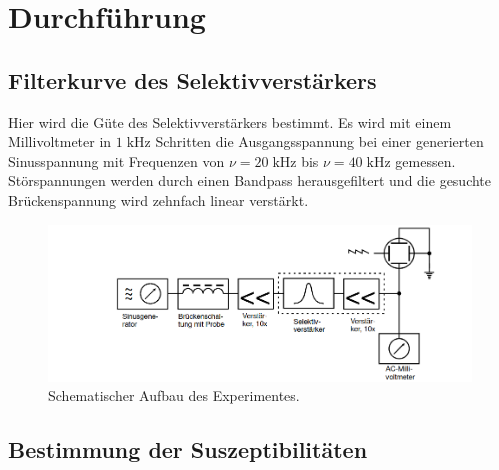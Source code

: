 \section{Durchführung}
\label{sec:Durchführung}

\subsection{Filterkurve des Selektivverstärkers}


Hier wird die Güte des Selektivverstärkers bestimmt. Es wird mit einem Millivoltmeter
in $1 \;\mathrm{kHz}$
Schritten die Ausgangsspannung bei einer generierten Sinusspannung mit Frequenzen 
von $\nu = 20 \; \mathrm{kHz}$ bis $\nu = 40 \; \mathrm{kHz}$ gemessen. \\
Störspannungen werden durch einen Bandpass herausgefiltert
und die gesuchte Brückenspannung wird zehnfach linear verstärkt.\\
\begin{figure}
    \centering
    \includegraphics[width=\textwidth]{content/Aufbau.png}
    \caption{Schematischer Aufbau des Experimentes.\cite{sample}}
    \label{fig:schematisch}
\end{figure}


\subsection{Bestimmung der Suszeptibilitäten}

